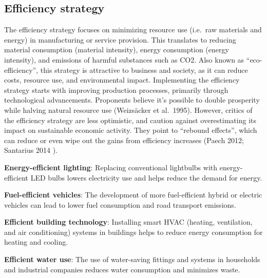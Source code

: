 \documentclass[
  a4paper,
  openany]{book}
\begin{document}
\subsection{Efficiency strategy}\label{efficiency-strategy}

The efficiency strategy focuses on minimizing resource use (i.e.~raw
materials and energy) in manufacturing or service provision. This
translates to reducing material consumption (material intensity), energy
consumption (energy intensity), and emissions of harmful substances such
as CO2. Also known as ``eco-efficiency'', this strategy is attractive to
business and society, as it can reduce costs, resource use, and
environmental impact. Implementing the efficiency strategy starts with
improving production processes, primarily through technological
advancements. Proponents believe it's possible to double prosperity
while halving natural resource use (Weizsäcker et al.~1995). However,
critics of the efficiency strategy are less optimistic, and caution
against overestimating its impact on sustainable economic activity. They
point to ``rebound effects'', which can reduce or even wipe out the
gains from efficiency increases (Paech 2012; Santarius 2014 ).

\begin{tcolorbox}[enhanced jigsaw, left=2mm, arc=.35mm, titlerule=0mm, opacityback=0, leftrule=.75mm, title={Putting Efficiency Strategies into Action: Examples}, breakable, bottomtitle=1mm, rightrule=.15mm, coltitle=black, toptitle=1mm, bottomrule=.15mm, colback=white, opacitybacktitle=0.6, colbacktitle=quarto-callout-tip-color!10!white, toprule=.15mm, colframe=quarto-callout-tip-color-frame]

\textbf{Energy-efficient lighting}: Replacing conventional lightbulbs
with energy-efficient LED bulbs lowers electricity use and helps reduce
the demand for energy.

\textbf{Fuel-efficient vehicles}: The development of more fuel-efficient
hybrid or electric vehicles can lead to lower fuel consumption and road
transport emissions.

\textbf{Efficient building technology}: Installing smart HVAC (heating,
ventilation, and air conditioning) systems in buildings helps to reduce
energy consumption for heating and cooling.

\textbf{Efficient water use}: The use of water-saving fittings and
systems in households and industrial companies reduces water consumption
and minimizes waste.

\end{tcolorbox}
\end{document}

